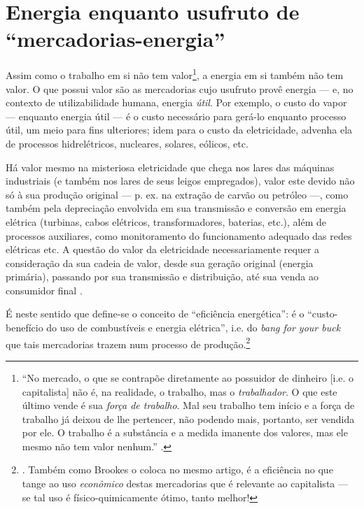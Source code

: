 \documentclass[12pt]{article}
\begin{document}
\section{Energia enquanto usufruto de ``mercadorias-energia''}
Assim como o trabalho em si não tem valor\footnote{``No mercado, o que se contrapõe diretamente ao possuidor de dinheiro [i.e. o capitalista] não é, na realidade, o trabalho, mas o \textit{trabalhador}. O que este último vende é sua \textit{força de trabalho}. Mal seu trabalho tem início e a força de trabalho já deixou de lhe pertencer, não podendo mais, portanto, ser vendida por ele. O trabalho é a substância e a medida imanente dos valores, mas ele mesmo não tem valor nenhum.'' \cite[p. 607; grifo meu]{Marx2017}.}, a energia em si também não tem valor. O que possui valor são as mercadorias cujo usufruto provê energia --- e, no contexto de utilizabilidade humana, energia \textit{útil}.%
Por exemplo, o custo do vapor --- enquanto energia útil --- é o custo necessário para gerá-lo enquanto processo útil, um meio para fins ulteriores; idem para o custo da eletricidade, advenha ela de processos hidrelétricos, nucleares, solares, eólicos, etc.

Há valor mesmo na misteriosa eletricidade que chega nos lares das máquinas industriais (e também nos lares de seus leigos empregados), valor este devido não só à sua produção original --- p. ex. na extração de carvão ou petróleo ---, como também pela depreciação envolvida em sua transmissão e conversão em energia elétrica (turbinas, cabos elétricos, transformadores, baterias, etc.), além de processos auxiliares, como monitoramento do funcionamento adequado das redes elétricas etc. A questão do valor da eletricidade necessariamente requer a consideração da sua cadeia de valor, desde sua geração original (energia primária), passando por sua transmissão e distribuição, até sua venda ao consumidor final \parencite{Richter2012, PintoJr2007}.


É neste sentido que define-se o conceito de ``eficiência energética'': é o ``custo-benefício do uso de combustíveis e energia elétrica'', i.e. do \textit{bang for your buck} que tais mercadorias trazem num processo de produção.\footnote{\cite[p. 356]{Brookes2000}. Também como Brookes o coloca no mesmo artigo, é a eficiência no que tange ao uso \textit{econômico} destas mercadorias que é relevante ao capitalista --- se tal uso é físico-quimicamente ótimo, tanto melhor!}
\end{document}
